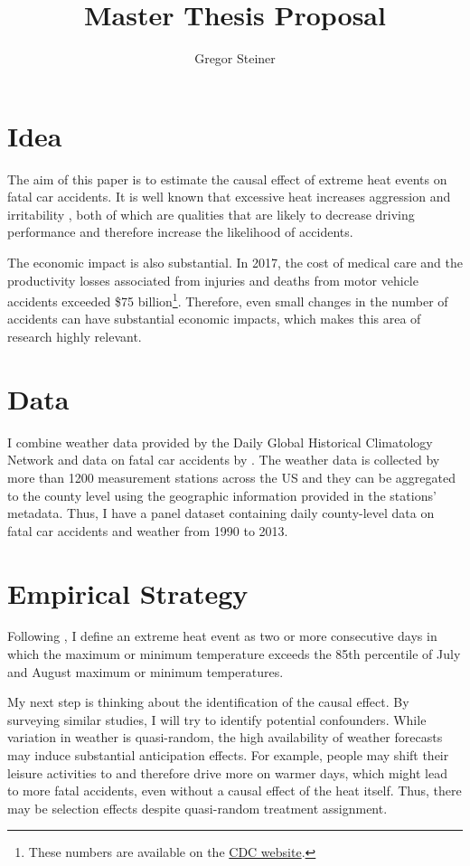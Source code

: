 \documentclass[11pt]{article}
\author{Gregor Steiner}
\title{Master Thesis Proposal}
\begin{document}
\maketitle

\section*{Idea}

The aim of this paper is to estimate the causal effect of extreme heat events on fatal car accidents. It is well known that excessive heat increases aggression and irritability \citep{anderson2011implications}, both of which are qualities that are likely to decrease driving performance and therefore increase the likelihood of accidents.

The economic impact is also substantial. In 2017, the cost of medical care and the productivity losses associated from injuries and deaths from motor vehicle accidents exceeded \$75 billion\footnote{These numbers are available on the \href{https://www.cdc.gov/transportationsafety/costs/index.html}{CDC website}.}. Therefore, even small changes in the number of accidents can have substantial economic impacts, which makes this area of research highly relevant.

\section*{Data}

I combine weather data provided by the Daily Global Historical Climatology Network \citep{Menne_2012} and data on fatal car accidents by \citet{Smith_2016}. The weather data is collected by more than 1200 measurement stations across the US and they can be aggregated to the county level using the geographic information provided in the stations' metadata. Thus, I have a panel dataset containing daily county-level data on fatal car accidents and weather from 1990 to 2013.

\section*{Empirical Strategy}

Following \citet{Habeeb_2015}, I define an extreme heat event as two or more
consecutive days in which the maximum or minimum temperature exceeds the 85th percentile of July and August maximum or minimum temperatures. 

My next step is thinking about the identification of the causal effect. By surveying similar studies, I will try to identify potential confounders. While variation in weather is quasi-random, the high availability of weather forecasts may induce substantial anticipation effects. For example, people may shift their leisure activities to and therefore drive more on warmer days, which might lead to more fatal accidents, even without a causal effect of the heat itself. Thus, there may be selection effects despite quasi-random treatment assignment.
\end{document}
